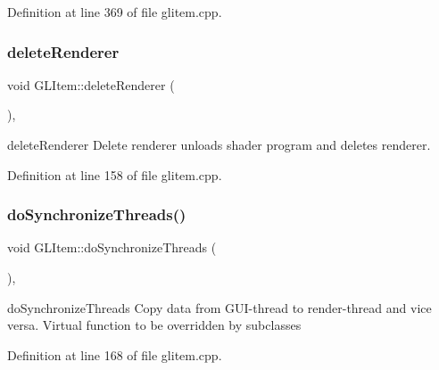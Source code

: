 Definition at line 369 of file glitem.\+cpp.

\mbox{\label{class_g_l_item_a88da6fcb94651b2d45bda9527d7e64c9}} 
\subsubsection{\texorpdfstring{deleteRenderer}{deleteRenderer}}
{\footnotesize\ttfamily void G\+L\+Item\+::delete\+Renderer (\begin{DoxyParamCaption}{ }\end{DoxyParamCaption})\hspace{0.3cm}{\ttfamily [protected]}, {\ttfamily [slot]}}



delete\+Renderer Delete renderer unloads shader program and deletes renderer. 



Definition at line 158 of file glitem.\+cpp.

\mbox{\label{class_g_l_item_aaec2f87eed24614ebed2268b10b3c342}} 
\subsubsection{\texorpdfstring{doSynchronizeThreads()}{doSynchronizeThreads()}}
{\footnotesize\ttfamily void G\+L\+Item\+::do\+Synchronize\+Threads (\begin{DoxyParamCaption}{ }\end{DoxyParamCaption})\hspace{0.3cm}{\ttfamily [protected]}, {\ttfamily [virtual]}}



do\+Synchronize\+Threads Copy data from G\+U\+I-\/thread to render-\/thread and vice versa. Virtual function to be overridden by subclasses 



Definition at line 168 of file glitem.\+cpp.

\mbox{\label{class_g_l_item_a5ae087d6d77f470952829beee4346af8}} 

